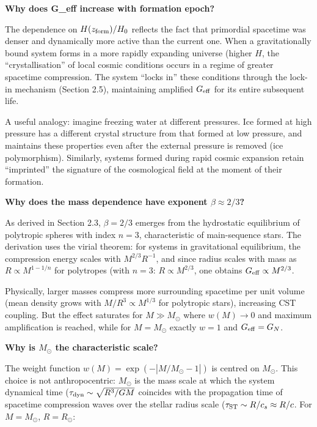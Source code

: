 \documentclass[11pt,a4paper]{article}
\begin{document}
\textbf{Why does G\_eff increase with formation epoch?}

The dependence on \(H(z_{\rm form})/H_0\) reflects the fact that
primordial spacetime was denser and dynamically more active than the
current one. When a gravitationally bound system forms in a more rapidly
expanding universe (higher \(H\), the ``crystallisation'' of local
cosmic conditions occurs in a regime of greater spacetime compression.
The system ``locks in'' these conditions through the lock-in mechanism
(Section 2.5), maintaining amplified \(G_{\rm eff}\) for its entire
subsequent life.

A useful analogy: imagine freezing water at different pressures. Ice
formed at high pressure has a different crystal structure from that
formed at low pressure, and maintains these properties even after the
external pressure is removed (ice polymorphism). Similarly, systems
formed during rapid cosmic expansion retain ``imprinted'' the signature
of the cosmological field at the moment of their formation.

\textbf{Why does the mass dependence have exponent
\(\beta \approx 2/3\)?}

As derived in Section 2.3, \(\beta = 2/3\) emerges from the hydrostatic
equilibrium of polytropic spheres with index \(n=3\), characteristic of
main-sequence stars. The derivation uses the virial theorem: for systems
in gravitational equilibrium, the compression energy scales with
\(M^{2/3} R^{-1}\), and since radius scales with mass as
\(R \propto M^{1-1/n}\) for polytropes (with \(n=3\):
\(R \propto M^{2/3}\), one obtains \(G_{\rm eff} \propto M^{2/3}\).

Physically, larger masses compress more surrounding spacetime per unit
volume (mean density grows with \(M/R^3 \propto M^{1/3}\) for polytropic
stars), increasing CST coupling. But the effect saturates for
\(M \gg M_\odot\) where \(w(M) \to 0\) and maximum amplification is
reached, while for \(M = M_\odot\) exactly \(w = 1\) and
\(G_{\rm eff} = G_N\).

\textbf{Why is \(M_\odot\) the characteristic scale?}

The weight function \(w(M) = \exp(-|M/M_\odot - 1|)\) is centred on
\(M_\odot\). This choice is not anthropocentric: \(M_\odot\) is the mass
scale at which the system dynamical time
(\(\tau_{\rm dyn} \sim \sqrt{R^3/GM}\) coincides with the propagation
time of spacetime compression waves over the stellar radius scale
(\(\tau_{\rm ST} \sim R/c_s \approx R/c\). For \(M = M_\odot\),
\(R = R_\odot\):
\end{document}
